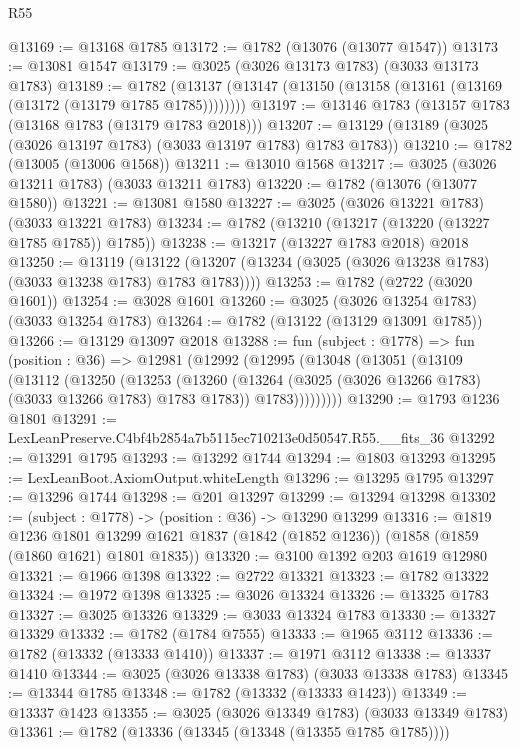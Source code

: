 \begin{lexlean}{R55}
\begin{coremodule}
@13169 := @13168 @1785
@13172 := @1782 (@13076 (@13077 @1547))
@13173 := @13081 @1547
@13179 := @3025 (@3026 @13173 @1783) (@3033 @13173 @1783)
@13189 := @1782 (@13137 (@13147 (@13150 (@13158 (@13161 (@13169 (@13172 (@13179 @1785 @1785))))))))
@13197 := @13146 @1783 (@13157 @1783 (@13168 @1783 (@13179 @1783 @2018)))
@13207 := @13129 (@13189 (@3025 (@3026 @13197 @1783) (@3033 @13197 @1783) @1783 @1783))
@13210 := @1782 (@13005 (@13006 @1568))
@13211 := @13010 @1568
@13217 := @3025 (@3026 @13211 @1783) (@3033 @13211 @1783)
@13220 := @1782 (@13076 (@13077 @1580))
@13221 := @13081 @1580
@13227 := @3025 (@3026 @13221 @1783) (@3033 @13221 @1783)
@13234 := @1782 (@13210 (@13217 (@13220 (@13227 @1785 @1785)) @1785))
@13238 := @13217 (@13227 @1783 @2018) @2018
@13250 := @13119
    (@13122 (@13207 (@13234 (@3025 (@3026 @13238 @1783) (@3033 @13238 @1783) @1783 @1783))))
@13253 := @1782 (@2722 (@3020 @1601))
@13254 := @3028 @1601
@13260 := @3025 (@3026 @13254 @1783) (@3033 @13254 @1783)
@13264 := @1782 (@13122 (@13129 @13091 @1785))
@13266 := @13129 @13097 @2018
@13288 := fun (subject : @1778) =>
  fun (position : @36) =>
  @12981
    (@12992
      (@12995
        (@13048
          (@13051
            (@13109
              (@13112
                (@13250
                  (@13253
                    (@13260
                      (@13264 (@3025 (@3026 @13266 @1783) (@3033 @13266 @1783) @1783 @1783))
                      @1783)))))))))
@13290 := @1793 @1236 @1801
@13291 := LexLeanPreserve.C4bf4b2854a7b5115ec710213e0d50547.R55.__fits_36
@13292 := @13291 @1795
@13293 := @13292 @1744
@13294 := @1803 @13293
@13295 := LexLeanBoot.AxiomOutput.whiteLength
@13296 := @13295 @1795
@13297 := @13296 @1744
@13298 := @201 @13297
@13299 := @13294 @13298
@13302 := (subject : @1778) -> (position : @36) -> @13290 @13299
@13316 := @1819
    @1236
    @1801
    @13299
    @1621
    @1837
    (@1842 (@1852 @1236))
    (@1858 (@1859 (@1860 @1621) @1801 @1835))
@13320 := @3100 @1392 @203 @1619 @12980
@13321 := @1966 @1398
@13322 := @2722 @13321
@13323 := @1782 @13322
@13324 := @1972 @1398
@13325 := @3026 @13324
@13326 := @13325 @1783
@13327 := @3025 @13326
@13329 := @3033 @13324 @1783
@13330 := @13327 @13329
@13332 := @1782 (@1784 @7555)
@13333 := @1965 @3112
@13336 := @1782 (@13332 (@13333 @1410))
@13337 := @1971 @3112
@13338 := @13337 @1410
@13344 := @3025 (@3026 @13338 @1783) (@3033 @13338 @1783)
@13345 := @13344 @1785
@13348 := @1782 (@13332 (@13333 @1423))
@13349 := @13337 @1423
@13355 := @3025 (@3026 @13349 @1783) (@3033 @13349 @1783)
@13361 := @1782 (@13336 (@13345 (@13348 (@13355 @1785 @1785))))

\end{coremodule}
\end{lexlean}
